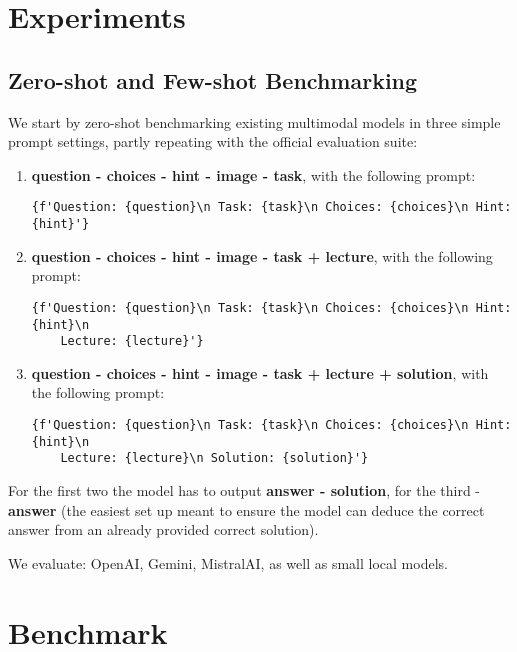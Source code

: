 \documentclass[10pt]{article}
\begin{document}
\section{Experiments}

\subsection{Zero-shot and Few-shot Benchmarking}
We start by zero-shot benchmarking existing multimodal models in three simple prompt settings, partly repeating with the official evaluation suite:
\begin{enumerate}
	\item \textbf{question - choices - hint - image - task}, with the following prompt:
	\begin{verbatim}{f'Question: {question}\n Task: {task}\n Choices: {choices}\n Hint: {hint}'}\end{verbatim}
	\item \textbf{question - choices - hint - image - task + lecture}, with the following prompt:
	\begin{verbatim}{f'Question: {question}\n Task: {task}\n Choices: {choices}\n Hint: {hint}\n 
	Lecture: {lecture}'}\end{verbatim}
	\item \textbf{question - choices - hint - image - task + lecture + solution}, with the following prompt:
	\begin{verbatim}{f'Question: {question}\n Task: {task}\n Choices: {choices}\n Hint: {hint}\n 
	Lecture: {lecture}\n Solution: {solution}'}\end{verbatim}
\end{enumerate}

For the first two the model has to output \textbf{answer - solution}, for the third - \textbf{answer} (the easiest set up meant to ensure the model can deduce the correct answer from an already provided correct solution). 

We evaluate: OpenAI, Gemini, MistralAI, as well as small local models. %

\section{Benchmark}
\end{document}
